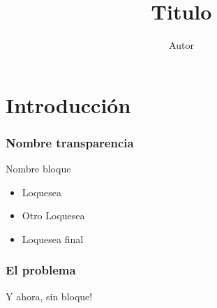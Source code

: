 \documentclass[24pt, a4paper, oneside, spanish]{beamer}
\begin{document}
\title{Titulo}
\author{Autor}

\begin{frame}
\titlepage
\end{frame}

\section{Introducción}

\begin{frame}
	\frametitle{Nombre transparencia}
	
	\begin{block}{Nombre bloque}
		\pause
		
		\begin{itemize}
		\item Loquesea
		\pause
		\item Otro Loquesea
		\pause
		\item Loquesea final
		\end{itemize}
	\end{block}
\end{frame}

\begin{frame}
	\frametitle{El problema}
	Y ahora, sin \pause bloque!
\end{frame}
\end{document}
